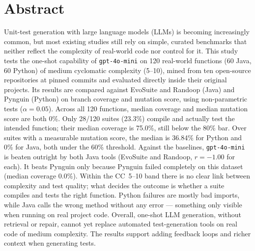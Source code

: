 \section*{Abstract}

Unit-test generation with large language models (LLMs) is becoming increasingly common,
but most existing studies still rely on simple, curated benchmarks that neither reflect
the complexity of real-world code nor control for it. This study tests the one-shot
capability of \texttt{gpt-4o-mini} on 120 real-world functions (60 Java, 60 Python) of
medium cyclomatic complexity (5--10), mined from ten open-source repositories at pinned
commits and evaluated directly inside their original projects. Its results are compared
against EvoSuite and Randoop (Java) and Pynguin (Python) on branch coverage and mutation
score, using non-parametric tests ($\alpha = 0.05$). Across all 120 functions, median
coverage and median mutation score are both 0\%. Only 28/120 suites (23.3\%) compile and
actually test the intended function; their median coverage is 75.0\%, still below the
80\% bar. Over suites with a measurable mutation score, the median is 36.84\% for Python
and 0\% for Java, both under the 60\% threshold. Against the baselines, \texttt{gpt-4o-mini} is beaten outright by both
Java tools (EvoSuite and Randoop, $r = -1.00$ for each). It beats Pynguin only because
Pynguin failed completely on this dataset (median coverage 0.0\%). Within the CC~5--10
band there is no clear link between complexity and test quality; what decides the
outcome is whether a suite compiles and tests the right function. Python failures are
mostly bad imports, while Java calls the wrong method without any error --- something
only visible when running on real project code. Overall, one-shot LLM generation,
without retrieval or repair, cannot yet replace automated test-generation tools on real
code of medium complexity. The results support adding feedback loops and richer context
when generating tests.
